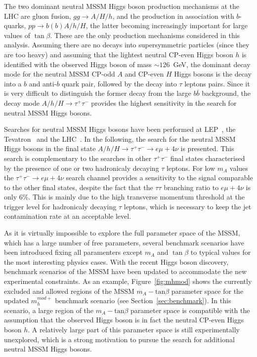 The two dominant neutral MSSM Higgs boson production mechanisms 
at the LHC are gluon fusion, $gg\rightarrow A/H/h$, and 
the production in association with $b$-quarks, $pp \rightarrow b(b)A/h/H$, the latter becoming increasingly 
important for large values of $\tan\beta$. These  are the only production mechanisms
considered in this analysis. 
Assuming there are no decays into supersymmetric particles  (since they are too heavy)
and assuming that the lightest neutral CP-even Higgs boson $h$ is identified with the observed Higgs boson
of mass $\sim 126$~GeV, the dominant decay mode for the neutral MSSM CP-odd $A$ and CP-even $H$ Higgs bosons
 is the decay into a  $b$ and anti-$b$ quark pair, %
followed by the decay into $\tau$ leptons pairs. Since it is very difficult to distinguish the former decay 
from the large $b\bar{b}$ background, the decay mode 
$A/h/H \rightarrow \tau^+ \tau^-$  provides the highest sensitivity in the search for neutral MSSM Higgs bosons.

Searches for neutral MSSM Higgs bosons have been performed at
LEP~\cite{LEPLimits}, the
Tevatron~\cite{TevatronLimits1} and the LHC~\cite{CMSLimit, ATLASLimit}. 
In the following, the search for the neutral MSSM Higgs bosons  in the final state 
$A/h/H \rightarrow \tau^+ \tau^- \rightarrow e \mu +4\nu$ is presented. 
This search is complementary to the searches in other $\tau^+\tau^-$ final states
characterised by the presence of one or two hadronicaly decaying $\tau$ leptons. For low $m_A$ values
the $\tau^+ \tau^- \rightarrow e \mu +4\nu$ search channel provides a sensitivity to the signal comparable to the 
other final states, despite  the fact that the $\tau\tau$ branching ratio to $e \mu +4\nu$ is only 6\%. 
This is mainly due to the high transverse momentum threshold at the trigger level for  hadronicaly decaying $\tau$ leptons,
which is necessary to keep the jet contamination rate at an acceptable level.

As it is virtually impossible to explore the full parameter space of the MSSM, 
which has a large number of free parameters, several benchmark scenarios have been  
introduced  fixing all paramenters except $m_A$ and $\tan\beta$  to typical values for the most interesting 
physics cases.
With the recent Higgs boson discovery, benchmark scenarios of the MSSM have been updated to 
accommodate the  new experimental constraints. 
As an example, Figure~\ref{fig:mhmod} shows the currently excluded and allowed regions of the MSSM $m_{A} - \text{tan}\beta$ 
parameter space for the updated  $m_{h}^{mod+}$ benchmark scenario (see Section~\ref{sec:benchmark}). 
In this scenario, a large region of the $m_{A} - \text{tan}\beta$
parameter space is compatible with the assumption that the observed Higgs boson is in fact the 
neutral CP-even  Higgs boson $h$. A relatively large part of this parameter space is still experimentally unexplored,
which is a strong motivation to pursue the search for additional neutral MSSM Higgs bosons.


